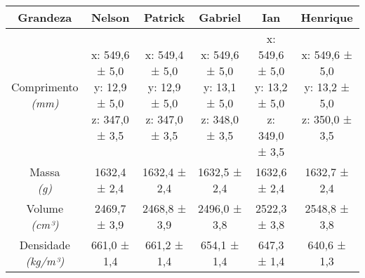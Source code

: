 \documentclass{article}
\begin{document}
\begin{table}[h!]
\centering
\begin{tabular}{c c c c c c }
\toprule
Grandeza & Nelson & Patrick & Gabriel & Ian & Henrique\\
\midrule
\shortstack{Comprimento\\\textit{(mm)}} & \shortstack{x: 549,6 ± 5,0\\y: 12,9 ± 5,0\\z: 347,0 ± 3,5} & \shortstack{x: 549,4 ± 5,0\\y: 12,9 ± 5,0\\z: 347,0 ± 3,5} & \shortstack{x: 549,6 ± 5,0\\y: 13,1 ± 5,0\\z: 348,0 ± 3,5} & \shortstack{x: 549,6 ± 5,0\\y: 13,2 ± 5,0\\z: 349,0 ± 3,5} & \shortstack{x: 549,6 ± 5,0\\y: 13,2 ± 5,0\\z: 350,0 ± 3,5}\\[4pt]
\shortstack{Massa\\\textit{(g)}} & 1632,4 ± 2,4 & 1632,4 ± 2,4 & 1632,5 ± 2,4 & 1632,6 ± 2,4 & 1632,7 ± 2,4\\[4pt]
\shortstack{Volume\\\textit{(cm³)}} & 2469,7 ± 3,9 & 2468,8 ± 3,9 & 2496,0 ± 3,8 & 2522,3 ± 3,8 & 2548,8 ± 3,8\\[4pt]
\shortstack{Densidade\\\textit{(kg/m³)}} & 661,0 ± 1,4 & 661,2 ± 1,4 & 654,1 ± 1,4 & 647,3 ± 1,4 & 640,6 ± 1,3\\[4pt]
\bottomrule
\end{tabular}
\end{table}
\end{document}
